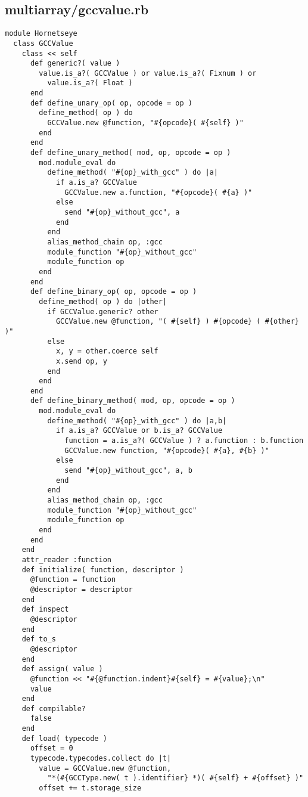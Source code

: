 \subsection{multiarray/gccvalue.rb}\label{cha:multiarray-gccvalue-rb}
\begin{lstlisting}
module Hornetseye
  class GCCValue
    class << self
      def generic?( value )
        value.is_a?( GCCValue ) or value.is_a?( Fixnum ) or
          value.is_a?( Float )
      end
      def define_unary_op( op, opcode = op )
        define_method( op ) do
          GCCValue.new @function, "#{opcode}( #{self} )"
        end
      end
      def define_unary_method( mod, op, opcode = op )
        mod.module_eval do
          define_method( "#{op}_with_gcc" ) do |a|
            if a.is_a? GCCValue
              GCCValue.new a.function, "#{opcode}( #{a} )"
            else
              send "#{op}_without_gcc", a
            end
          end
          alias_method_chain op, :gcc
          module_function "#{op}_without_gcc"
          module_function op
        end
      end
      def define_binary_op( op, opcode = op )
        define_method( op ) do |other|
          if GCCValue.generic? other
            GCCValue.new @function, "( #{self} ) #{opcode} ( #{other} )"
          else
            x, y = other.coerce self
            x.send op, y
          end
        end
      end
      def define_binary_method( mod, op, opcode = op )
        mod.module_eval do
          define_method( "#{op}_with_gcc" ) do |a,b|
            if a.is_a? GCCValue or b.is_a? GCCValue
              function = a.is_a?( GCCValue ) ? a.function : b.function
              GCCValue.new function, "#{opcode}( #{a}, #{b} )"
            else
              send "#{op}_without_gcc", a, b
            end
          end
          alias_method_chain op, :gcc
          module_function "#{op}_without_gcc"
          module_function op
        end
      end
    end
    attr_reader :function
    def initialize( function, descriptor ) 
      @function = function
      @descriptor = descriptor
    end
    def inspect
      @descriptor
    end
    def to_s
      @descriptor
    end
    def assign( value )
      @function << "#{@function.indent}#{self} = #{value};\n"
      value
    end
    def compilable?
      false
    end
    def load( typecode )
      offset = 0
      typecode.typecodes.collect do |t|
        value = GCCValue.new @function,
          "*(#{GCCType.new( t ).identifier} *)( #{self} + #{offset} )"
        offset += t.storage_size

\end{lstlisting}
